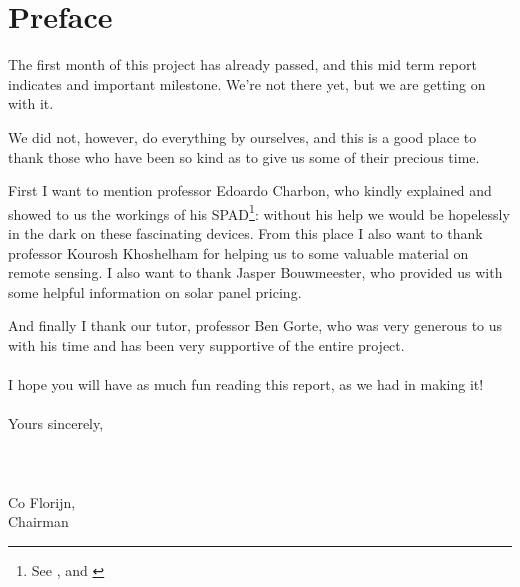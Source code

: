 \chapter*{Preface}

The first month of this project has already passed, and this mid term report indicates and important milestone. We're not there yet, but we are getting on with it.

We did not, however, do everything by ourselves, and this is a good place to thank those who have been so kind as to give us some of their precious time.

First I want to mention professor Edoardo Charbon, who kindly explained and showed to us the workings of his \ac{SPAD}\footnote{See \cite[98-105]{SPADThesis}, \cite{SPAD2} and \cite{SPAD3}}: without his help we would be hopelessly in the dark on these fascinating devices. From this place I also want to thank professor Kourosh Khoshelham for helping us to some valuable material on remote sensing. I also want to thank Jasper Bouwmeester, who provided us with some helpful information on solar panel pricing.

And finally I thank our tutor, professor Ben Gorte, who was very generous to us with his time and has been very supportive of the entire project.\\\\
I hope you will have as much fun reading this report, as we had in making it!\\\\
Yours sincerely,\\\\\\\\
 \hspace{2cm}Co Florijn,\\
 \hspace{2cm}Chairman